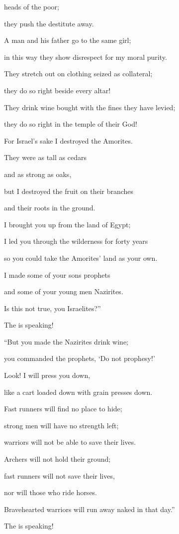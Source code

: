 {heads
of the poor;
\par }{\Q they push
the destitute away.
\par }{\Q A man
and his father
go
to
the same girl;
\par }{\Q in this
way
they
show
disrespect for my
moral purity.
\par }{\Q {}They stretch
out on
clothing
seized as collateral;
\par }{\Q they do so right beside
every
altar!
\par }{\Q They drink
wine
bought with the fines
they have levied;
\par }{\Q they do so right in the temple
of their God!
\par }{\Q {}For Israel’s sake I
destroyed
the Amorites.
\par }{\Q They were as tall
as cedars
\par }{\Q and as strong
as oaks,
\par }{\Q but I destroyed
the fruit
on their branches
\par }{\Q and their roots
in the ground.
\par }{\Q {}I
brought you up
from the land
of Egypt;
\par }{\Q I led
you through the wilderness
for forty
years
\par }{\Q so you could take
the
Amorites’
land as your own.
\par }{\Q {}I made some
of your sons
prophets
\par }{\Q and some of your young men
Nazirites.
\par }{\Q Is this
not
true, you Israelites?”
\par }{\Q The
{}
is speaking!
\par }{\Q {}“But you made the Nazirites
drink
wine;
\par }{\Q you commanded
the prophets,
‘Do not
prophesy!’
\par }{\Q {}Look! I
will press
you down,
\par }{\Q like a cart
loaded down
with grain
presses down.
\par }{\Q {}Fast runners
will find no place
to hide;
\par }{\Q strong
men will have no
strength
left;
\par }{\Q warriors
will not
be able to save
their lives.
\par }{\Q {}Archers
will not
hold their ground;
\par }{\Q fast
runners
will not
save
their lives,
\par }{\Q nor
will those who ride
horses.
\par }{\Q {}Bravehearted
warriors
will run away
naked
in that
day.”
\par }{\Q The
{}
is speaking!

}
